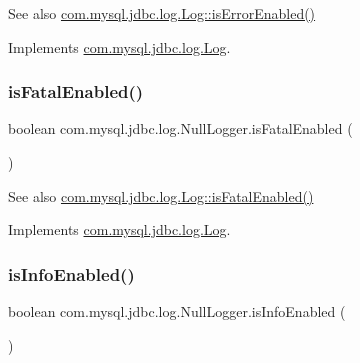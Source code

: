 \begin{DoxySeeAlso}{See also}
\mbox{\hyperlink{interfacecom_1_1mysql_1_1jdbc_1_1log_1_1_log_aece1d483e86ea84bd1553ed993c56c59}{com.\+mysql.\+jdbc.\+log.\+Log\+::is\+Error\+Enabled()}} 
\end{DoxySeeAlso}


Implements \mbox{\hyperlink{interfacecom_1_1mysql_1_1jdbc_1_1log_1_1_log_aece1d483e86ea84bd1553ed993c56c59}{com.\+mysql.\+jdbc.\+log.\+Log}}.

\mbox{\label{classcom_1_1mysql_1_1jdbc_1_1log_1_1_null_logger_a7393a431840b4e7cb9ac18f0e2a88744}} 
\subsubsection{\texorpdfstring{is\+Fatal\+Enabled()}{isFatalEnabled()}}
{\footnotesize\ttfamily boolean com.\+mysql.\+jdbc.\+log.\+Null\+Logger.\+is\+Fatal\+Enabled (\begin{DoxyParamCaption}{ }\end{DoxyParamCaption})}

\begin{DoxySeeAlso}{See also}
\mbox{\hyperlink{interfacecom_1_1mysql_1_1jdbc_1_1log_1_1_log_acc3f527d8a1e3143e312eb4368c3632a}{com.\+mysql.\+jdbc.\+log.\+Log\+::is\+Fatal\+Enabled()}} 
\end{DoxySeeAlso}


Implements \mbox{\hyperlink{interfacecom_1_1mysql_1_1jdbc_1_1log_1_1_log_acc3f527d8a1e3143e312eb4368c3632a}{com.\+mysql.\+jdbc.\+log.\+Log}}.

\mbox{\label{classcom_1_1mysql_1_1jdbc_1_1log_1_1_null_logger_a0fd40d0617f53beec5f85253996a1e5f}} 
\subsubsection{\texorpdfstring{is\+Info\+Enabled()}{isInfoEnabled()}}
{\footnotesize\ttfamily boolean com.\+mysql.\+jdbc.\+log.\+Null\+Logger.\+is\+Info\+Enabled (\begin{DoxyParamCaption}{ }\end{DoxyParamCaption})}

